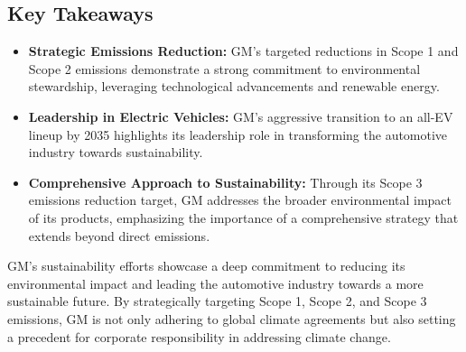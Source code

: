 \subsection*{Key Takeaways}
\begin{itemize}
    \item \textbf{Strategic Emissions Reduction:} GM's targeted reductions in Scope 1 and Scope 2 emissions demonstrate a strong commitment to environmental stewardship, leveraging technological advancements and renewable energy.
    \item \textbf{Leadership in Electric Vehicles:} GM's aggressive transition to an all-EV lineup by 2035 highlights its leadership role in transforming the automotive industry towards sustainability.
    \item \textbf{Comprehensive Approach to Sustainability:} Through its Scope 3 emissions reduction target, GM addresses the broader environmental impact of its products, emphasizing the importance of a comprehensive strategy that extends beyond direct emissions.
\end{itemize}

GM's sustainability efforts showcase a deep commitment to reducing its environmental impact and leading the automotive industry towards a more sustainable future. By strategically targeting Scope 1, Scope 2, and Scope 3 emissions, GM is not only adhering to global climate agreements but also setting a precedent for corporate responsibility in addressing climate change.




